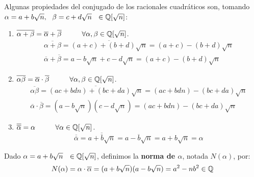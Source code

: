 Algunas propiedades del conjugado de los racionales cuadráticos son, tomando $\alpha = a+b\sqrt{n},~~\beta = c+d\sqrt{n}~~ \in \mathbb Q[\sqrt{n}]$:
\begin{enumerate}
    \item $\overline{\alpha + \beta} = \overline{\alpha} + \overline{\beta} \hspace{1cm} \forall \alpha, \beta \in \mathbb Q[\sqrt{n}]$.
    \begin{gather*}
        \overline{\alpha + \beta} = \overline{(a+c) + (b+d)\sqrt{n}} = (a+c) - (b+d)\sqrt{n} \\
        \overline{\alpha} + \overline{\beta} = a-b\sqrt{n} + c-d\sqrt{n} = (a+c) - (b+d)\sqrt{n}
    \end{gather*}

    \item $\overline{\alpha\beta} = \overline{\alpha} \cdot \overline{\beta} \hspace{1cm} \forall \alpha, \beta \in \mathbb Q[\sqrt{n}]$.
    \begin{gather*}
        \overline{\alpha\beta} = \overline{(ac + bdn) + (bc + da)\sqrt{n}} = (ac + bdn) - (bc + da)\sqrt{n} \\
        \overline{\alpha} \cdot \overline{\beta} = (a-b\sqrt{n})(c-d\sqrt{n}) = (ac + bdn) - (bc + da)\sqrt{n}
    \end{gather*}

    \item $\overline{\overline{\alpha}} = \alpha \hspace{1cm} \forall \alpha \in \mathbb Q[\sqrt{n}]$.
    $$\overline{\overline{\alpha}} = \overline{\overline{a+b\sqrt{n}}} = \overline{a-b\sqrt{n}} = a+b\sqrt{n} = \alpha$$
\end{enumerate}

\begin{definicion}[Norma]
    Dado $\alpha=a+b\sqrt{n} ~~\in \mathbb Q[\sqrt{n}]$, definimos la \textbf{norma de $\alpha$}, notada $N(\alpha)$, por:
    $$N(\alpha) = \alpha \cdot \overline{\alpha} = (a+b\sqrt{n})(a-b\sqrt{n}) = a^2 - nb^2 \in \mathbb Q$$
\end{definicion}


